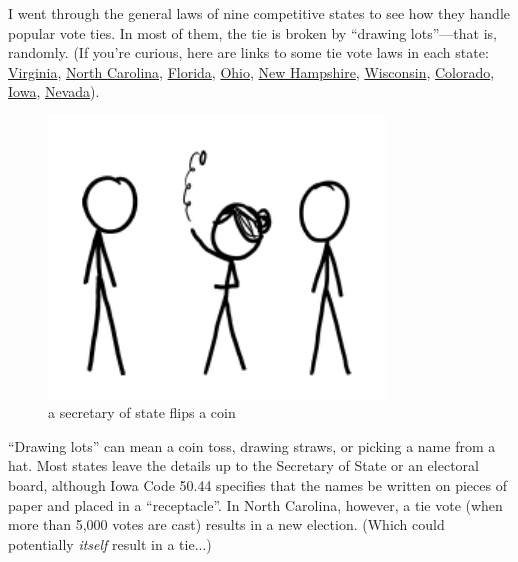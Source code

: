 {I went through the general laws of nine competitive states to see how they handle popular vote ties. In most of them, the tie is broken by “drawing lots”—that is, randomly. (If you’re curious, here are links to some tie vote laws in each state: \href{http://leg1.state.va.us/cgi-bin/legp504.exe?000+cod+24.2-674}{Virginia}, \href{http://law.onecle.com/north-carolina/163-elections-and-election-laws/163-182.8.html}{North Carolina}, \href{http://election.dos.state.fl.us/publications/pdf/2012/2012\_Election\_Laws.pdf}{Florida}, \href{http://codes.ohio.gov/orc/3505.33}{Ohio}, \href{http://www.gencourt.state.nh.us/rsa/html/lxiii/667/667-17.htm}{New Hampshire}, \href{http://docs.legis.wi.gov/statutes/statutes/5/I/01}{Wisconsin}, \href{http://www.state.co.us/gov\_dir/leg\_dir/olls/sl1999/sl\_154.htm}{Colorado}, \href{http://search.legis.state.ia.us/nxt/gateway.dll/ic/1/13/2174/2175/2582/2629?f=templates\%24fn=document-frameset.htm\%24q=\%5Bfield\%2050.44\%5D\%24x=Advanced}{Iowa}, \href{http://www.leg.state.nv.us/NRS/NRS-293.html\#NRS293Sec400}{Nevada}).}

\begin{figure}[!htbp]
\centering
\includegraphics[scale=0.5, max width=0.8\textwidth]{imgs/a/19/tie_coin_toss.png}
\caption{a secretary of state flips a coin}
\end{figure}

{“Drawing lots” can mean a coin toss, drawing straws, or picking a name from a hat. Most states leave the details up to the Secretary of State or an electoral board, although Iowa Code 50.44 specifies that the names be written on pieces of paper and placed in a “receptacle”. In North Carolina, however, a tie vote (when more than 5,000 votes are cast) results in a new election. (Which could potentially \emph{itself} result in a tie...)}

